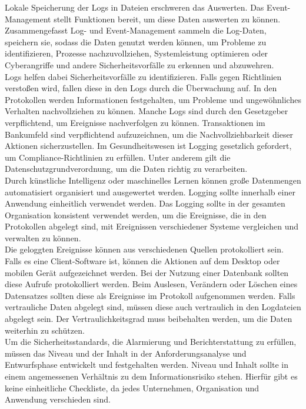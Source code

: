Lokale Speicherung der Logs in Dateien erschweren das Auswerten.
Das Event-Management stellt Funktionen bereit, um diese Daten auswerten zu können.
Zusammengefasst Log- und Event-Management sammeln die Log-Daten, speichern sie, sodass die Daten genutzt werden können, um Probleme zu identifizieren, Prozesse nachzuvollziehen, Systemleistung optimieren oder Cyberangriffe und andere Sicherheitsvorfälle zu erkennen und abzuwehren.
\\
Logs helfen dabei Sicherheitsvorfälle zu identifizieren.
Falls gegen Richtlinien verstoßen wird, fallen diese in den Logs durch die Überwachung auf.
In den Protokollen werden Informationen festgehalten, um Probleme und ungewöhnliches Verhalten nachvollziehen zu können.
Manche Logs sind durch den Gesetzgeber verpflichtend, um Ereignisse nachverfolgen zu können.
Transaktionen im Bankumfeld sind verpflichtend aufzuzeichnen, um die Nachvollziehbarkeit dieser Aktionen sicherzustellen.
Im Gesundheitswesen ist Logging gesetzlich gefordert, um Compliance-Richtlinien zu erfüllen.
Unter anderem gilt die Datenschutzgrundverordnung, um die Daten richtig zu verarbeiten.
\\
Durch künstliche Intelligenz oder maschinelles Lernen können große Datenmengen automatisiert organisiert und ausgewertet werden.
Logging sollte innerhalb einer Anwendung einheitlich verwendet werden.
Das Logging sollte in der gesamten Organisation konsistent verwendet werden, um die Ereignisse, die in den Protokollen abgelegt sind, mit Ereignissen verschiedener Systeme vergleichen und verwalten zu können.
\\
Die geloggten Ereignisse können aus verschiedenen Quellen protokolliert sein.
Falls es eine Client-Software ist, können die Aktionen auf dem Desktop oder mobilen Gerät aufgezeichnet werden.
Bei der Nutzung einer Datenbank sollten diese Aufrufe protokolliert werden.
Beim Auslesen, Verändern oder Löschen eines Datensatzes sollten diese als Ereignisse im Protokoll aufgenommen werden.
Falls vertrauliche Daten abgelegt sind, müssen diese auch vertraulich in den Logdateien abgelegt sein.
Der Vertraulichkeitsgrad muss beibehalten werden, um die Daten weiterhin zu schützen.
\\
Um die Sicherheitsstandards, die Alarmierung und Berichterstattung zu erfüllen, müssen das Niveau und der Inhalt in der Anforderungsanalyse und Entwurfsphase entwickelt und festgehalten werden.
Niveau und Inhalt sollte in einem angemessenen Verhältnis zu dem Informationsrisiko stehen.
Hierfür gibt es keine einheitliche Checkliste, da jedes Unternehmen, Organisation und Anwendung verschieden sind.
